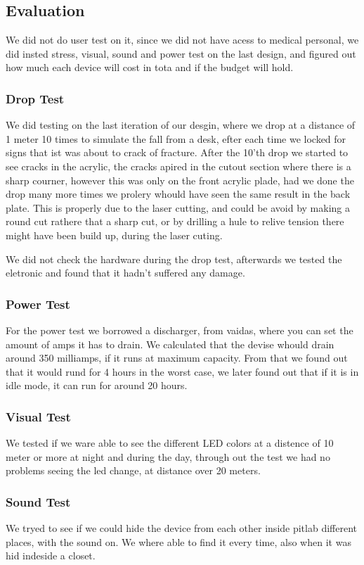\subsection{Evaluation}
We did not do user test on it, since we did not have acess to medical personal, we did insted stress, visual, sound and power test on the last design, and figured out how much each device will cost in tota and if the budget will hold.

\subsubsection{Drop Test}
We did testing on the last iteration of our desgin, where we drop at a distance of 1 meter 10 times to simulate the fall from a desk, efter each time we locked for signs that ist was about to crack of fracture.
After the 10'th drop we started to see cracks in the acrylic, the cracks apired in the cutout section where there is a sharp courner, however this was only on the front acrylic plade, had we done the drop many more times we prolery whould have seen the same result in the back plate. 
This is properly due to the laser cutting, and could be avoid by making a round cut rathere that a sharp cut, or by drilling a hule to relive tension there might have been build up, during the laser cuting.

We did not check the hardware during the drop test, afterwards we tested the eletronic and found that it hadn't suffered any damage.

\subsubsection{Power Test}
For the power test we borrowed a discharger, from vaidas, where you can set the amount of amps it has to drain.
We calculated that the devise whould drain around 350 milliamps, if it runs at maximum capacity.
From that we found out that it would rund for 4 hours in the worst case, we later found out that if it is in idle mode, it can run for around 20 hours.

\subsubsection{Visual Test}
We tested if we ware able to see the different LED colors at a distence of 10 meter or more at night and during the day, through out the test we had no problems seeing the led change, at distance over 20 meters.

\subsubsection{Sound Test}
We tryed to see if we could hide the device from each other inside pitlab different places, with the sound on.
We where able to find it every time, also when it was hid indeside a closet.

